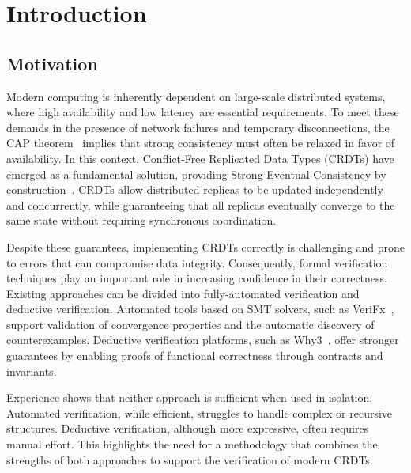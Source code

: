 
%

\chapter{Introduction}
\label{cha:introduction}

\section{Motivation}
\label{sec:motivation}

\ntindex[Motivation]{}

Modern computing is inherently dependent on large-scale distributed systems, where high availability and low latency are essential requirements. To meet these demands in the presence of network failures and temporary disconnections, the CAP theorem~\cite{cap-theorem} implies that strong consistency must often be relaxed in favor of availability. In this context, Conflict-Free Replicated Data Types (CRDTs) have emerged as a fundamental solution, providing Strong Eventual Consistency by construction~\cite{shapiro2011comprehensive}. CRDTs allow distributed replicas to be updated independently and concurrently, while guaranteeing that all replicas eventually converge to the same state without requiring synchronous coordination.

Despite these guarantees, implementing CRDTs correctly is challenging and prone to errors that can compromise data integrity. Consequently, formal verification techniques play an important role in increasing confidence in their correctness. Existing approaches can be divided into fully-automated verification and deductive verification. Automated tools based on SMT solvers, such as VeriFx~\cite{porre2023masses}, support validation of convergence properties and the automatic discovery of counterexamples. Deductive verification platforms, such as Why3~\cite{why3}, offer stronger guarantees by enabling proofs of functional correctness through contracts and invariants.

Experience shows that neither approach is sufficient when used in isolation. Automated verification, while efficient, struggles to handle complex or recursive structures. Deductive verification, although more expressive, often requires manual effort. This highlights the need for a methodology that combines the strengths of both approaches to support the verification of modern CRDTs.

